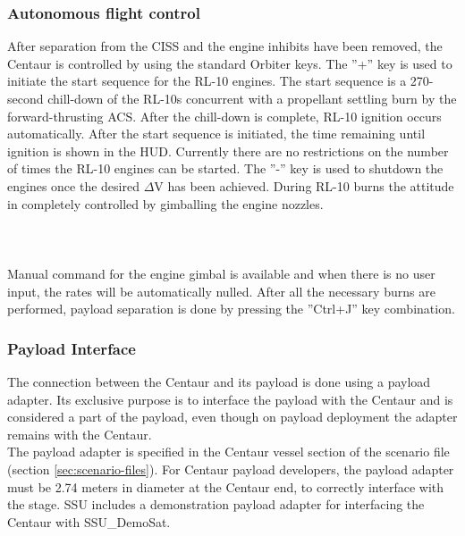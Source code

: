 \documentclass[Space_Shuttle_Ultra_Manual.tex]{subfiles}
\begin{document}
\begin{multicols*}{2}
\subsubsection{Autonomous flight control}
After separation from the CISS and the engine inhibits have been removed, the Centaur is controlled by using the standard Orbiter keys. The ''+'' key is used to initiate the start sequence for the RL-10 engines. The start sequence is a 270-second chill-down of the RL-10s concurrent with a propellant settling burn by the forward-thrusting ACS. After the chill-down is complete, RL-10 ignition occurs automatically. After the start sequence is initiated, the time remaining until ignition is shown in the HUD. Currently there are no restrictions on the number of times the RL-10 engines can be started. The ''-'' key is used to shutdown the engines once the desired $\Delta$V has been achieved. During RL-10 burns the attitude in completely controlled by gimballing the engine nozzles.
\\
\\
\\
\\
Manual command for the engine gimbal is available and when there is no user input, the rates will be automatically nulled. After all the necessary burns are performed, payload separation is done by pressing the ''Ctrl+J'' key combination.

\subsubsection{Payload Interface}
The connection between the Centaur and its payload is done using a payload adapter. Its exclusive purpose is to interface the payload with the Centaur and is considered a part of the payload, even though on payload deployment the adapter remains with the Centaur.\\
The payload adapter is specified in the Centaur vessel section of the scenario file (section \ref{sec:scenario-files}).
For Centaur payload developers, the payload adapter must be 2.74 meters in diameter at the Centaur end, to correctly interface with the stage. SSU includes a demonstration payload adapter for interfacing the Centaur with SSU\_DemoSat.

\end{multicols*}
\newpage
\end{document}
